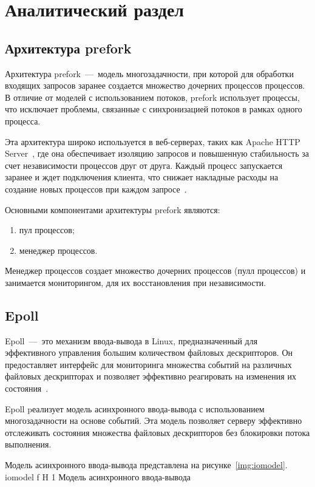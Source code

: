 \chapter{Аналитический раздел} 

\section{Архитектура prefork}

Архитектура prefork~---~модель многозадачности, при которой для обработки входящих запросов заранее создается множество дочерних процессов процессов. 
В отличие от моделей с использованием потоков, prefork использует процессы, что исключает проблемы, связанные с синхронизацией потоков в рамках одного процесса.

Эта архитектура широко используется в веб-серверах, таких как Apache HTTP Server~\cite{apache_http_server}, где она обеспечивает изоляцию запросов и повышенную стабильность за счет независимости процессов друг от друга. 
Каждый процесс запускается заранее и ждет подключения клиента, что снижает накладные расходы на создание новых процессов при каждом запросе~\cite{prefork}. 

Основными компонентами архитектуры prefork являются:
\begin{enumerate}
	\item пул процессов;
	\item менеджер процессов.
\end{enumerate}

Менеджер процессов создает множество дочерних процессов (пулл процессов) и занимается мониторингом, для их восстановления при независимости.
\clearpage

\section{Epoll}

Epoll~---~это механизм ввода-вывода в Linux, предназначенный для эффективного управления большим количеством файловых дескрипторов. 
Он предоставляет интерфейс для мониторинга множества событий на различных файловых дескрипторах и позволяет эффективно реагировать на изменения их состояния~\cite{epoll}.

Epoll pеализует модель асинхронного ввода-вывода с использованием многозадачности на основе событий. 
Эта модель позволяет серверу эффективно отслеживать состояния множества файловых дескрипторов без блокировки потока выполнения.

Модель асинхронного ввода-вывода представлена на рисунке~\ref{img:iomodel}.
	{iomodel}
	{f}
	{H}
	{1\textwidth}
	{Модель асинхронного ввода-вывода}

